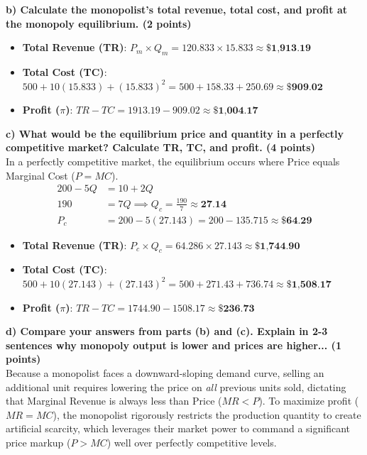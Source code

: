 \documentclass[11pt, letterpaper]{article}
\begin{document}
\textbf{b) Calculate the monopolist's total revenue, total cost, and profit at the monopoly equilibrium. (2 points)}
\begin{itemize}[leftmargin=*, noitemsep]
    \item \textbf{Total Revenue (TR)}: $P_m \times Q_m = 120.833 \times 15.833 \approx \textbf{\$1,913.19}$
    \item \textbf{Total Cost (TC)}: $500 + 10(15.833) + (15.833)^2 = 500 + 158.33 + 250.69 \approx \textbf{\$909.02}$
    \item \textbf{Profit ($\pi$)}: $TR - TC = 1913.19 - 909.02 \approx \textbf{\$1,004.17}$
\end{itemize}

\textbf{c) What would be the equilibrium price and quantity in a perfectly competitive market? Calculate TR, TC, and profit. (4 points)} \\
In a perfectly competitive market, the equilibrium occurs where Price equals Marginal Cost ($P = MC$).
\begin{align*}
    200 - 5Q &= 10 + 2Q \\
    190 &= 7Q \implies Q_c = \frac{190}{7} \approx \textbf{27.14} \\
    P_c &= 200 - 5(27.143) = 200 - 135.715 \approx \textbf{\$64.29}
\end{align*}
\begin{itemize}[leftmargin=*, noitemsep]
    \item \textbf{Total Revenue (TR)}: $P_c \times Q_c = 64.286 \times 27.143 \approx \textbf{\$1,744.90}$
    \item \textbf{Total Cost (TC)}: $500 + 10(27.143) + (27.143)^2 = 500 + 271.43 + 736.74 \approx \textbf{\$1,508.17}$
    \item \textbf{Profit ($\pi$)}: $TR - TC = 1744.90 - 1508.17 \approx \textbf{\$236.73}$
\end{itemize}

\textbf{d) Compare your answers from parts (b) and (c). Explain in 2-3 sentences why monopoly output is lower and prices are higher... (1 points)} \\
Because a monopolist faces a downward-sloping demand curve, selling an additional unit requires lowering the price on \textit{all} previous units sold, dictating that Marginal Revenue is always less than Price ($MR < P$). To maximize profit ($MR=MC$), the monopolist rigorously restricts the production quantity to create artificial scarcity, which leverages their market power to command a significant price markup ($P > MC$) well over perfectly competitive levels.
\end{document}

